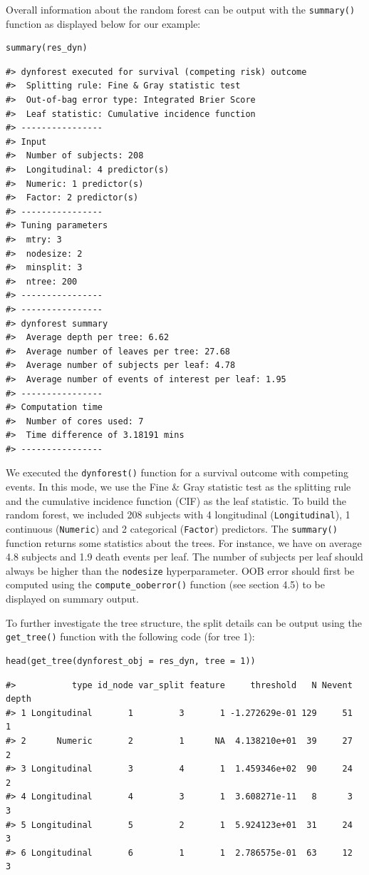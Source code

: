 Overall information about the random forest can be output with the \texttt{summary()} function as displayed below for our example:

\begin{verbatim}
summary(res_dyn)
\end{verbatim}

\begin{verbatim}
#> dynforest executed for survival (competing risk) outcome
#>  Splitting rule: Fine & Gray statistic test
#>  Out-of-bag error type: Integrated Brier Score
#>  Leaf statistic: Cumulative incidence function
#> ----------------
#> Input
#>  Number of subjects: 208
#>  Longitudinal: 4 predictor(s)
#>  Numeric: 1 predictor(s)
#>  Factor: 2 predictor(s)
#> ----------------
#> Tuning parameters
#>  mtry: 3
#>  nodesize: 2
#>  minsplit: 3
#>  ntree: 200
#> ----------------
#> ----------------
#> dynforest summary
#>  Average depth per tree: 6.62
#>  Average number of leaves per tree: 27.68
#>  Average number of subjects per leaf: 4.78
#>  Average number of events of interest per leaf: 1.95
#> ----------------
#> Computation time
#>  Number of cores used: 7
#>  Time difference of 3.18191 mins
#> ----------------
\end{verbatim}

We executed the \texttt{dynforest()} function for a survival outcome with competing events. In this mode, we use the Fine \& Gray statistic test as the splitting rule and the cumulative incidence function (CIF) as the leaf statistic. To build the random forest, we included 208 subjects with 4 longitudinal (\texttt{Longitudinal}), 1 continuous (\texttt{Numeric}) and 2 categorical (\texttt{Factor}) predictors. The \texttt{summary()} function returns some statistics about the trees. For instance, we have on average 4.8 subjects and 1.9 death events per leaf. The number of subjects per leaf should always be higher than the \texttt{nodesize} hyperparameter. OOB error should first be computed using the \texttt{compute\_ooberror()} function (see section 4.5) to be displayed on summary output.

To further investigate the tree structure, the split details can be output using the \texttt{get\_tree()} function with the following code (for tree 1):

\begin{verbatim}
head(get_tree(dynforest_obj = res_dyn, tree = 1))
\end{verbatim}

\begin{verbatim}
#>           type id_node var_split feature     threshold   N Nevent depth
#> 1 Longitudinal       1         3       1 -1.272629e-01 129     51     1
#> 2      Numeric       2         1      NA  4.138210e+01  39     27     2
#> 3 Longitudinal       3         4       1  1.459346e+02  90     24     2
#> 4 Longitudinal       4         3       1  3.608271e-11   8      3     3
#> 5 Longitudinal       5         2       1  5.924123e+01  31     24     3
#> 6 Longitudinal       6         1       1  2.786575e-01  63     12     3
\end{verbatim}

